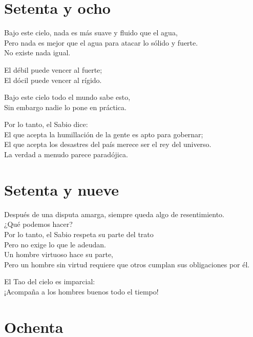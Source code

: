\documentclass[book,b5paper,hidelinks,final]{memoir}
\begin{document}
	\chapter*{Setenta y ocho}
	
	Bajo este cielo, nada es más suave y fluido que el agua,\\
	Pero nada es mejor que el agua para atacar lo sólido y fuerte.\\
	No existe nada igual.
	
	El débil puede vencer al fuerte;\\
	El dócil puede vencer al rígido.
	
	Bajo este cielo todo el mundo sabe esto,\\
	Sin embargo nadie lo pone en práctica.
	
	Por lo tanto, el Sabio dice:\\
	El que acepta la humillación de la gente es apto para gobernar;\\
	El que acepta los desastres del país merece ser el rey del universo.\\
	La verdad a menudo parece paradójica.
	
	\chapter*{Setenta y nueve}
	
	Después de una disputa amarga, siempre queda algo de resentimiento.\\
	¿Qué podemos hacer?\\
	Por lo tanto, el Sabio respeta su parte del trato\\
	Pero no exige lo que le adeudan.\\
	Un hombre virtuoso hace su parte,\\
	Pero un hombre sin virtud requiere que otros cumplan sus obligaciones
	por él.
	
	El Tao del cielo es imparcial:\\
	¡Acompaña a los hombres buenos todo el tiempo!
	
	\chapter*{Ochenta}
	
\end{document}
